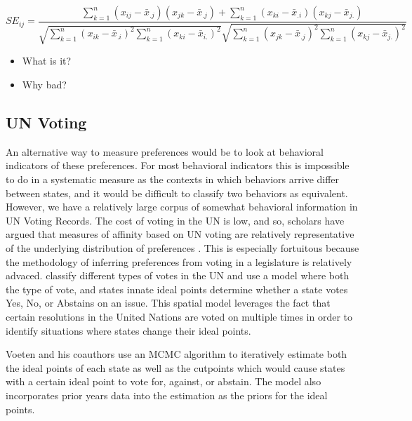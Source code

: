 \documentclass[12pt,onesided,fullpage]{amsart}
\begin{document}
\begin{equation}
SE_{ij} = \frac{\sum_{k = 1}^n (x_{ij} - \bar{x}_{.j})(x_{jk} - \bar{x}_{.j}) + \sum_{k=1}^n (x_{ki} - \bar{x}_{.i})(x_{kj} - \bar{x}_{j.})}{\sqrt{\sum_{k = 1}^n (x_{ik} - \bar{x}_{.i})^2 \sum_{k = 1}^n (x_{ki} - \bar{x}_{i.})^2}\sqrt{\sum_{k = 1}^n (x_{jk} - \bar{x}_{.j})^2 \sum_{k = 1}^n (x_{kj} - \bar{x}_{j.})^2}}
\end{equation}
\begin{itemize}
\item What is it?
\item Why bad?
\end{itemize}

\subsection{UN Voting}
An alternative way to measure preferences would be to look at behavioral indicators of these preferences. For most behavioral indicators this is impossible to do in a systematic measure as the contexts in which behaviors arrive differ between states, and it would be difficult to classify two behaviors as equivalent. However, we have a relatively large corpus of somewhat behavioral information in UN Voting Records. The cost of voting in the UN is low, and so, scholars have argued that measures of affinity based on UN voting are relatively representative of the underlying distribution of preferences \citep{gartzke:1998}. This is especially fortuitous because the methodology of inferring preferences from voting in a legislature is relatively advaced. \citet{voeten} classify different types of votes in the UN and use a model where both the type of vote, and states innate ideal points determine whether a state votes Yes, No, or Abstains on an issue. This spatial model leverages the fact that certain resolutions in the United Nations are voted on multiple times in order to identify situations where states change their ideal points.

Voeten and his coauthors use an MCMC algorithm to iteratively estimate both the ideal points of each state as well as the cutpoints which would cause states with a certain ideal point to vote for, against, or abstain. The model also incorporates prior years data into the estimation as the priors for the ideal points.
\end{document}
